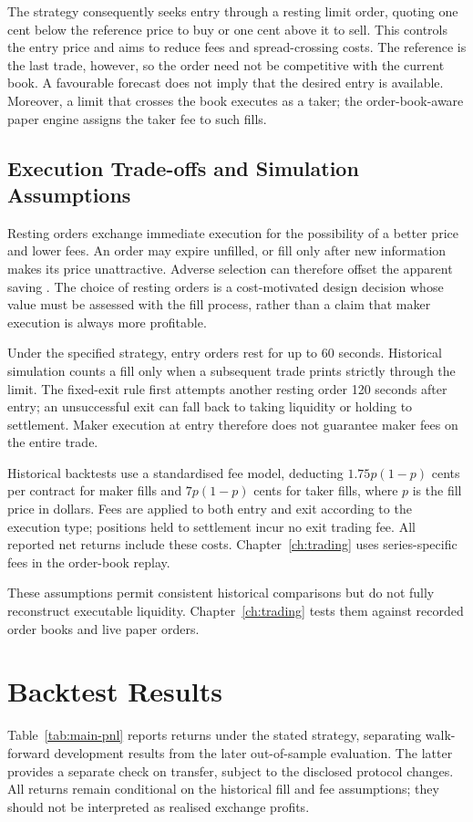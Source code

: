 \documentclass[12pt,a4paper,oneside]{report}
\begin{document}
The strategy consequently seeks entry through a resting limit order, quoting
one cent below the reference price to buy or one cent above it to sell. This
controls the entry price and aims to reduce fees and spread-crossing costs.
The reference is the last trade, however, so the order need not be competitive
with the current book. A favourable forecast does not imply that the desired
entry is available. Moreover, a limit that crosses the book executes as a taker;
the order-book-aware paper engine assigns the taker fee to such fills.

\subsection{Execution Trade-offs and Simulation Assumptions}\label{sec:exec-tradeoffs}
Resting orders exchange immediate execution for the possibility of a better
price and lower fees. An order may expire unfilled, or fill only after new
information makes its price unattractive. Adverse selection can therefore offset
the apparent saving \citep{glosten1985bid}. The choice of resting orders is a
cost-motivated design decision whose value must be assessed with the fill process,
rather than a claim that maker execution is always more profitable.

Under the specified strategy, entry orders rest for up to 60 seconds. Historical
simulation counts a fill only when a subsequent trade prints strictly through
the limit. The fixed-exit rule first attempts another resting order 120 seconds
after entry; an unsuccessful exit can fall back to taking liquidity or holding
to settlement. Maker execution at entry therefore does not guarantee maker fees
on the entire trade.

Historical backtests use a standardised fee model, deducting $1.75p(1-p)$ cents
per contract for maker fills and $7p(1-p)$ cents for taker fills, where $p$ is
the fill price in dollars. Fees are applied to both entry and exit according
to the execution type; positions held to settlement incur no exit trading fee.
All reported net returns include these costs. Chapter~\ref{ch:trading} uses
series-specific fees in the order-book replay.

These assumptions permit consistent historical comparisons but do not fully
reconstruct executable liquidity. Chapter~\ref{ch:trading} tests them against
recorded order books and live paper orders.

\section{Backtest Results}\label{sec:exp-main}
Table~\ref{tab:main-pnl} reports returns under the stated strategy, separating
walk-forward development results from the later out-of-sample evaluation. The latter provides a separate
check on transfer, subject to the disclosed protocol changes. All returns
remain conditional on the historical fill and fee assumptions; they should not
be interpreted as realised exchange profits.
\end{document}
